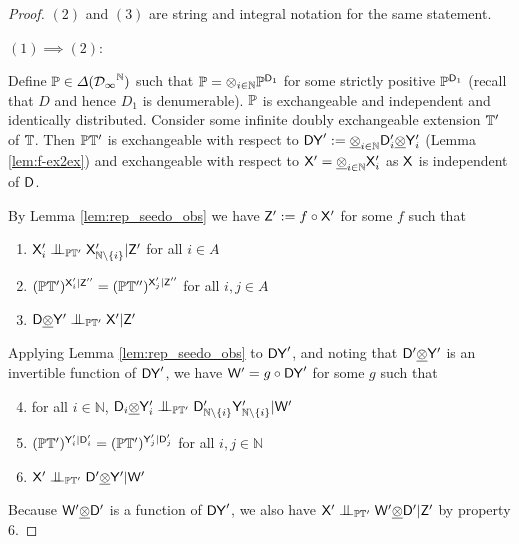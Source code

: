 \begin{proof}
$(2)$ and $(3)$ are string and integral notation for the same statement. 

$(1)\implies (2)$:

Define $\mathbb{P}\in \Delta(\mathcal{D_1}^{\mathbb{N}})$ such that $\mathbb{P}=\otimes_{i\in\mathbb{N}} \mathbb{P}^{\mathsf{D}_1}$ for some strictly positive $\mathbb{P}^{\mathsf{D}_1}$ (recall that $D$ and hence $D_1$ is denumerable). $\mathbb{P}$ is exchangeable and independent and identically distributed. Consider some infinite doubly exchangeable extension $\mathbb{T}'$ of $\mathbb{T}$. Then $\mathbb{P}\mathbb{T}'$ is exchangeable with respect to $\mathsf{DY}':=\underline{\otimes}_{i\in \mathbb{N}}\mathsf{D}'_i\underline{\otimes}\mathsf{Y}'_i$ (Lemma \ref{lem:f-ex2ex}) and exchangeable with respect to $\mathsf{X}'=\underline{\otimes}_{i\in\mathbb{N}} \mathsf{X}'_i$ as $\mathsf{X}$ is independent of $\mathsf{D}$.


By Lemma \ref{lem:rep_seedo_obs} we have $\mathsf{Z}':= f\circ\mathsf{X}'$ for some $f$ such that 
\begin{enumerate}
    \item $\RV{X}'_i\CI_{\prob{P}\kernel{T}'}\RV{X}'_{\mathbb{N}\setminus\{i\}}|\RV{Z}'$ for all $i\in A$
    \item $(\mathbb{P}\mathbb{T}')^{\mathsf{X}'_i|\mathsf{Z}''}=(\mathbb{P}\mathbb{T}'')^{\mathsf{X}'_j|\mathsf{Z}''}$ for all $i,j\in A$
    \item $\RV{D}\utimes\RV{Y}'\CI_{\prob{P}\kernel{T}'}\RV{X}'|\RV{Z}'$
\end{enumerate}

Applying Lemma  \ref{lem:rep_seedo_obs} to $\mathsf{DY}'$, and noting that $\mathsf{D}'\underline{\otimes}\mathsf{Y}'$ is an invertible function of $\mathsf{DY}'$, we have $\mathsf{W}'=g\circ\mathsf{DY}'$ for some $g$ such that

\begin{enumerate}
    \setcounter{enumi}{3}
    \item for all $i\in \mathbb{N}$, $\RV{D}_i\utimes\RV{Y}'_i\CI_{\prob{P}\kernel{T}'}\RV{D}'_{\mathbb{N}\setminus\{i\}}\RV{Y}'_{\mathbb{N}\setminus\{i\}}|\RV{W}'$
    \item $(\mathbb{P}\mathbb{T}')^{\mathsf{Y}'_i|\mathsf{D}'_i}=(\mathbb{P}\mathbb{T}')^{\mathsf{Y}'_j|\mathsf{D}'_j}$ for all $i,j\in \mathbb{N}$ 
    \item $\RV{X}'\CI_{\prob{P}\kernel{T}'}\RV{D}'\utimes\RV{Y}'|\RV{W}'$
\end{enumerate}

Because $\mathsf{W}'\underline{\otimes}\mathsf{D}'$ is a function of $\mathsf{DY}'$, we also have $\RV{X}'\CI_{\prob{P}\kernel{T}'} \RV{W}'\utimes\RV{D}'|\RV{Z}'$ by property 6.


\end{proof}
